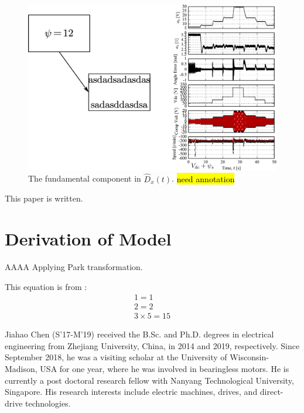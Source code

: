 \documentclass[journal]{IEEEtran}
\begin{document}
\begin{figure}[!t]
  \centering
  \includegraphics[width=1\hsize]{images/805-0700-slessinv-Vdc-0-FontAsPath-inkscaped.pdf}
  \vspace{-2ex}
  \caption{The fundamental component in $\hat D_x(t)$. \hl{need annotation}}
  \label{fig:FundamentalDx}
\vspace{-2.5ex}
\end{figure}

This paper is written.

\appendix

\section*{Derivation of Model}\label{app:eemf}
AAAA
Applying Park transformation.

This equation is from \cite{2021-Woldegiorgis.Ge.ea-New}:
\begin{subequations}\label{eq:numbers}
\begin{align}
1=1
\\
2=2
\\
3\times 5=15
\end{align}
\end{subequations}




%

\begin{IEEEbiography}{Jiahao Chen}
    (S'17-M'19) received the B.Sc. and Ph.D. degrees in electrical engineering from Zhejiang University, China, in 2014 and 2019, respectively.
    Since September 2018, he was a visiting scholar at the University of Wisconsin-Madison, USA for one year, where he was involved in bearingless motors.
    He is currently a post doctoral research fellow with Nanyang Technological University, Singapore.
    His research interests include electric machines, drives, and direct-drive technologies.
\end{IEEEbiography}
\end{document}
